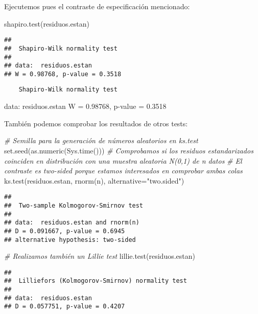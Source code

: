 \documentclass[
]{article}
\newenvironment{Shaded}{\begin{snugshade}}{\end{snugshade}}
\newcommand{\AttributeTok}[1]{\textcolor[rgb]{0.77,0.63,0.00}{#1}}
\newcommand{\CommentTok}[1]{\textcolor[rgb]{0.56,0.35,0.01}{\textit{#1}}}
\newcommand{\FunctionTok}[1]{\textcolor[rgb]{0.00,0.00,0.00}{#1}}
\newcommand{\NormalTok}[1]{#1}
\newcommand{\StringTok}[1]{\textcolor[rgb]{0.31,0.60,0.02}{#1}}
\begin{document}
Ejecutemos pues el contraste de especificación mencionado:

\begin{Shaded}
\begin{Highlighting}[]
\FunctionTok{shapiro.test}\NormalTok{(residuos.estan)}
\end{Highlighting}
\end{Shaded}

\begin{verbatim}
## 
##  Shapiro-Wilk normality test
## 
## data:  residuos.estan
## W = 0.98768, p-value = 0.3518
\end{verbatim}

\begin{verbatim}
    Shapiro-Wilk normality test
\end{verbatim}

data: residuos.estan W = 0.98768, p-value = 0.3518

También podemos comprobar los resultados de otros tests:

\begin{Shaded}
\begin{Highlighting}[]
 \CommentTok{\# Semilla para la generación de números aleatorios en ks.test}
\FunctionTok{set.seed}\NormalTok{(}\FunctionTok{as.numeric}\NormalTok{(}\FunctionTok{Sys.time}\NormalTok{()))                 }
\CommentTok{\# Comprobamos si los residuos estandarizados coinciden en distribución con una muestra aleatoria N(0,1) de n datos}
\CommentTok{\# El contraste es two{-}sided porque estamos interesados en comprobar ambas colas}
\FunctionTok{ks.test}\NormalTok{(residuos.estan, }\FunctionTok{rnorm}\NormalTok{(n), }\AttributeTok{alternative=}\StringTok{"two.sided"}\NormalTok{)     }
\end{Highlighting}
\end{Shaded}

\begin{verbatim}
## 
##  Two-sample Kolmogorov-Smirnov test
## 
## data:  residuos.estan and rnorm(n)
## D = 0.091667, p-value = 0.6945
## alternative hypothesis: two-sided
\end{verbatim}

\begin{Shaded}
\begin{Highlighting}[]
\CommentTok{\# Realizamos también un Lillie test}
\FunctionTok{lillie.test}\NormalTok{(residuos.estan)}
\end{Highlighting}
\end{Shaded}

\begin{verbatim}
## 
##  Lilliefors (Kolmogorov-Smirnov) normality test
## 
## data:  residuos.estan
## D = 0.057751, p-value = 0.4207
\end{verbatim}
\end{document}
